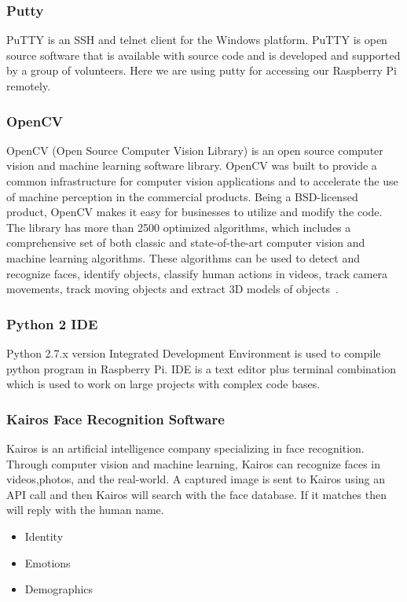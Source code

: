 \subsubsection{Putty}
PuTTY is an SSH and telnet client for the Windows platform. PuTTY is open 
source software that is available with source code and is developed and 
supported by a group of volunteers. Here we are using putty for accessing 
our Raspberry Pi remotely.

\subsubsection{OpenCV}
OpenCV (Open Source Computer Vision Library) is an open source computer 
vision and machine learning software library. OpenCV was built to provide 
a common infrastructure for computer vision applications and to accelerate 
the use of machine perception in the commercial products. Being a 
BSD-licensed product, OpenCV makes it easy for businesses to utilize and 
modify the code. The library has more than 2500 optimized algorithms, 
which includes a comprehensive set of both classic and state-of-the-art 
computer vision and machine learning algorithms. These algorithms can be 
used to detect and recognize faces, identify objects, classify human 
actions in videos, track camera movements, track moving objects and extract 
3D models of objects~\cite{opencv}.

\subsubsection{Python 2 IDE}
Python 2.7.x version Integrated Development Environment is used to compile 
python program in Raspberry Pi. IDE is a text editor plus terminal 
combination which is used to work on large projects with complex code bases.

\subsubsection{Kairos Face Recognition Software}
Kairos is an artificial intelligence company specializing in face recognition. 
Through computer vision and machine learning, Kairos can recognize faces in 
videos,photos, and the real-world. A captured image is sent to Kairos using 
an API call and then Kairos will search with the face database. If it matches 
then will reply with the human name.

\begin{itemize}
\item Identity
\item Emotions
\item Demographics
\end{itemize}

